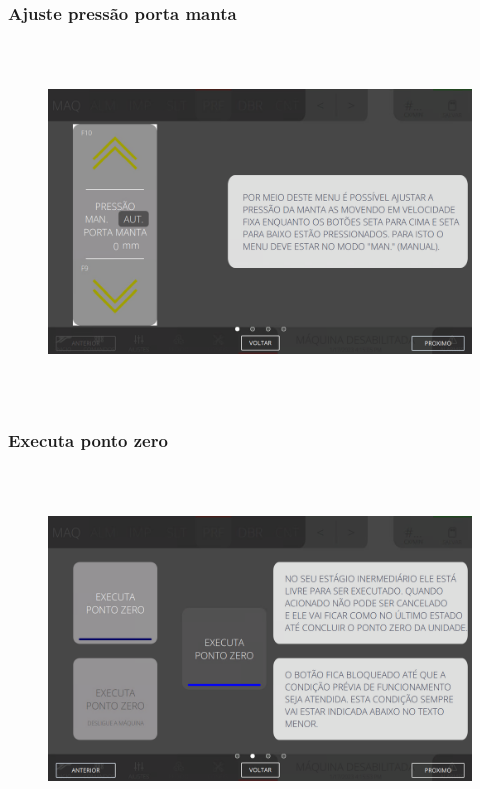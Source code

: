 \subsubsection{\small{Ajuste pressão porta manta}}\label{telaComandoPerfuradoraAjustePressaoPortaManta}
\vspace*{\fill}
\begin{figure}[h]
  \centering
  \includegraphics[width=576px,height=360px]{src/imagesFlexo/06-drilling/commands/e-1.png}
\end{figure}
\vspace*{\fill}

\newpage
\thispagestyle{fancy}
\vspace*{40 pt}
\subsubsection{\small{Executa ponto zero}}\label{telaComandoPerfuradoraExecutaPontoZero}
\vspace*{\fill}
\begin{figure}[h]
  \centering
  \includegraphics[width=576px,height=360px]{src/imagesFlexo/06-drilling/commands/e-2.png}
\end{figure}
\vspace*{\fill}

